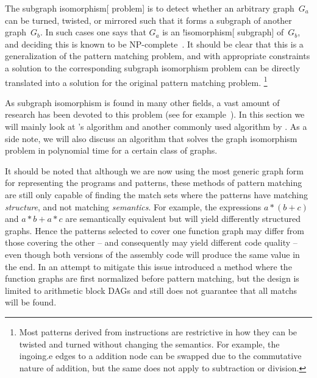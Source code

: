 The \gls{subgraph isomorphism}[ problem] is to detect whether an arbitrary
\gls{graph}~$G_a$ can be turned, twisted, or mirrored such that it forms a
\gls{subgraph} of another \gls{graph}~$G_b$.
%
In such cases one says that $G_a$ is an \glsshort!{isomorphism}[ \gls{subgraph}]
of~$G_b$, and deciding this is known to be NP-complete~\cite{Cook:1971}.
%
It should be clear that this is a generalization of the \gls{pattern matching}
problem, and with appropriate constraints a solution to the corresponding
\gls{subgraph isomorphism} problem can be directly translated into a solution
for the original \gls{pattern matching} problem.\!%
%
\footnote{%
  Most \glspl{pattern} derived from \glspl{instruction} are restrictive in how
  they can be twisted and turned without changing the semantics.
  For example, the \gls{ingoing.e} \glspl{edge} to a addition \gls{node} can be
  swapped due to the commutative nature of addition, but the same does not apply
  to subtraction or division.%
}

As \gls{subgraph isomorphism} is found in many other fields, a vast amount of
research has been devoted to this problem (see for example~\cite{Ullmann:1976,
  CordellaEtAl:2001, GuoEtAl:2003, KrissinelHenrick:2004, SorlinSolnon:2004,
  Gallagher:2006, FanEtAl:2010, FanEtAl:2011, HinoEtAl:2012}).
%
In this section we will mainly look at \citeauthor{Ullmann:1976}'s algorithm and
another commonly used algorithm by \citeauthor{CordellaEtAl:2001}.
%
As a side note, we will also discuss an algorithm that solves the \gls{graph
  isomorphism} problem in polynomial time for a certain class of \glspl{graph}.

It should be noted that although we are now using the most generic \gls{graph}
form for representing the \glspl{program} and \glspl{pattern}, these methods of
\gls{pattern matching} are still only capable of finding the \glspl{match set}
where the \glspl{pattern} have matching \emph{structure}, and not matching
\emph{semantics}.
%
For example, the expressions \mbox{$a * (b + c)$} and \mbox{$a * b + a * c$} are
semantically equivalent but will yield differently structured \glspl{graph}.
%
Hence the \glspl{pattern} selected to cover one \gls{function graph} may differ
from those covering the other -- and consequently may yield different code
quality -- even though both versions of the \gls{assembly code} will produce the
same value in the end.
%
In an attempt to mitigate this issue \textcite{AroraEtAl:2010} introduced a
method where the \glspl{function graph} are first normalized before \gls{pattern
  matching}, but the design is limited to arithmetic \glspl{block DAG} and still
does not guarantee that all \glspl{match} will be found.


